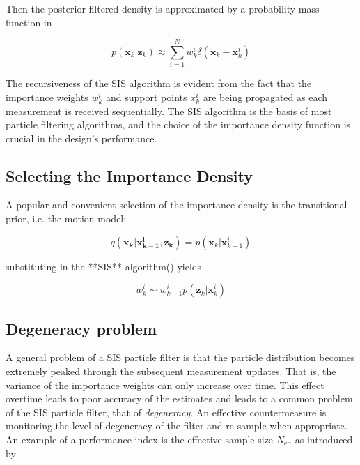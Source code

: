 Then the posterior filtered density is approximated by a probability mass function in 

\begin{equation}\label{eq:posterior_pmf}
p(\mathbf{x}_k | \mathbf{z}_k) \approx \sum_{i=1}^N w_k^i \delta(\mathbf{x}_k - \mathbf{x}_k^i)
\end{equation}


The recursiveness of the SIS algorithm is evident from the fact that the importance weights $w_k^i$ and support points $x_k^i$ are being propagated as each measurement is received sequentially. The SIS algorithm is the basis of most particle filtering algorithms, and the choice of the importance density function is crucial in the design's performance.

\subsection{Selecting the Importance Density}

A popular and convenient selection of the importance density is the transitional prior, i.e. the motion model\cite{Ristic2004}:

\begin{equation}\label{eq:SISmotmodel}
q(\mathbf{x_k | x_{k-1}^i , \mathbf{z}_k}) = p(\mathbf{x}_k | \mathbf{x}_{k-1}^i)
\end{equation}

substituting  in the **SIS** algorithm() yields 

\begin{equation}\label{eq:SIS2}
 w_k^i \sim w_{k-1}^i p(\mathbf{z}_k | \mathbf{x}_k^i)
\end{equation}


\subsection{Degeneracy problem}

A general problem of a SIS particle filter is that the particle distribution becomes extremely peaked through the subsequent measurement updates. That is, the variance of the importance weights can only increase over time. This effect overtime leads to poor accuracy of the estimates and leads to a common problem of the SIS particle filter, that of \emph{degeneracy}. An effective countermeasure is monitoring the level of degeneracy of the filter and re-sample when appropriate. An example of a performance index is the effective sample size $N_{\text{eff}}$ as introduced by\cite{Kong1994}


